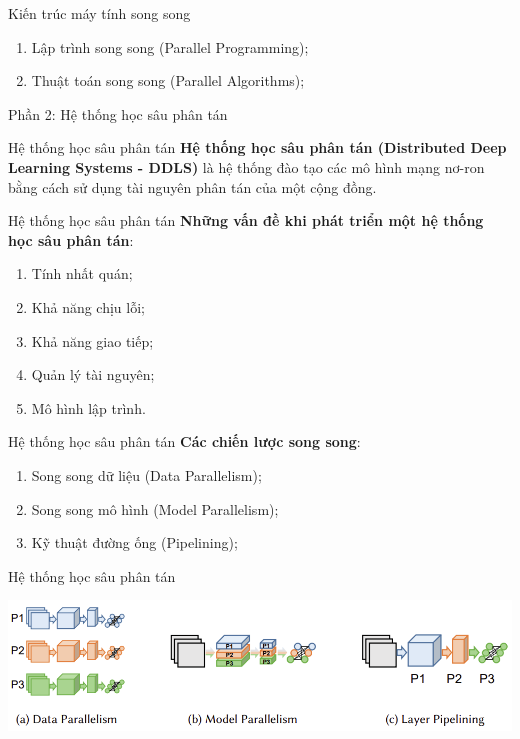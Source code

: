 \documentclass[notheorems,hyperref={bookmarks=true}]{beamer}
\theoremstyle{plain}
\numberwithin{equation}{section}
\begin{document}
\begin{footnotesize}
\begin{frame}{Kiến trúc máy tính song song}
\begin{enumerate}[-]
	\item Lập trình song song (Parallel Programming);
	\item Thuật toán song song (Parallel Algorithms);
\end{enumerate}
\end{frame}

\begin{frame}
\begin{center}
\Large Phần 2: Hệ thống học sâu phân tán
\end{center}
\end{frame}

\begin{frame}{ Hệ thống học sâu phân tán}
\textbf{Hệ thống học sâu phân tán (Distributed Deep Learning Systems - DDLS)} \pause
 là hệ thống đào tạo các mô hình mạng nơ-ron bằng cách sử dụng tài nguyên phân tán của một cộng đồng.
\end{frame}

\begin{frame}{ Hệ thống học sâu phân tán}
\textbf{Những vấn đề khi phát triển một hệ thống học sâu phân tán}: \pause
\begin{enumerate}[i]
	\item Tính nhất quán;\pause
	\item Khả năng chịu lỗi;\pause
	\item Khả năng giao tiếp;\pause
	\item Quản lý tài nguyên;\pause
	\item Mô hình lập trình.
\end{enumerate}
\end{frame}


\begin{frame}{ Hệ thống học sâu phân tán}
\textbf{Các chiến lược song song}: 
\begin{enumerate}[i]
	\item Song song dữ liệu (Data Parallelism);
	\item Song song mô hình (Model Parallelism);
	\item Kỹ thuật đường ống (Pipelining);
\end{enumerate}
\end{frame}

\begin{frame}{Hệ thống học sâu phân tán}
\begin{center}
\includegraphics[scale=0.55]{parallel_1.PNG}
\end{center}
\end{frame}


\end{footnotesize}
\end{document}
